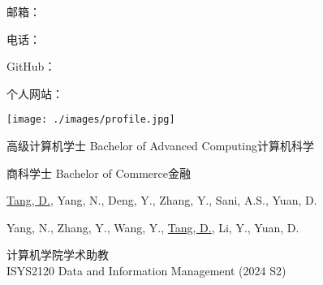 \documentclass[11pt]{article}
\begin{document}
\begin{minipage}[t]{0.65\textwidth}
  \hspace{-21pt}
  {\Huge \MyNameCN}

  \vspace{1em}
  \hspace{-20pt}
  邮箱：\MyEmail 

  \hspace{-20pt}
	电话：\MyPhone 

  \hspace{-20pt}
	GitHub：\href{\MyGitHub}{\MyGitHub}

  \hspace{-20pt}
	个人网站：\href{\MyWebsite}{\MyWebsite}
\end{minipage}
\hspace{42pt}
\begin{minipage}[t]{0.2\textwidth}
  \vspace{-35pt} %
  \texttt{[image: ./images/profile.jpg]} 
\end{minipage}
\hfill

\vspace{1em}


{高级计算机学士 Bachelor of Advanced Computing}{计算机科学}

{商科学士 Bachelor of Commerce}{金融}


{\underline{Tang, D.}, Yang, N., Deng, Y., Zhang, Y., Sani, A.S., Yuan, D.}

{Yang, N., Zhang, Y., Wang, Y., \underline{Tang, D.}, Li, Y., Yuan, D.}


{计算机学院学术助教}
{\\
ISYS2120 Data and Information Management (2024 S2) \\
}
\end{document}
